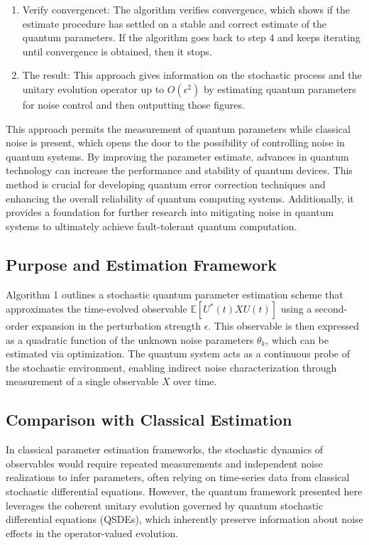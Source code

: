\documentclass[journal,twocolumn]{IEEEtran}
\begin{document}
\begin{enumerate}
 \item  Verify convergencet: The algorithm verifies convergence, which shows if the estimate procedure has settled on a stable and correct estimate of the quantum parameters. If the algorithm goes back to step 4 and keeps iterating until convergence is obtained, then it stops.
 \item The result: This approach gives information on the stochastic process and the unitary evolution operator up to $O(\epsilon^2)$ by estimating quantum parameters for noise control and then outputting those figures.
\end{enumerate}  
 This approach permits the measurement of quantum parameters while classical noise is present, which opens the door to the possibility of controlling noise in quantum systems. By improving the parameter estimate, advances in quantum technology can increase the performance and stability of quantum devices. This method is crucial for developing quantum error correction techniques and enhancing the overall reliability of quantum computing systems. Additionally, it provides a foundation for further research into mitigating noise in quantum systems to ultimately achieve fault-tolerant quantum computation. 
 \subsection{ Purpose and Estimation Framework}

Algorithm 1 outlines a stochastic quantum parameter estimation scheme that approximates the time-evolved observable \( \mathbb{E}[U^*(t) X U(t)] \) using a second-order expansion in the perturbation strength \( \epsilon \). This observable is then expressed as a quadratic function of the unknown noise parameters \( \theta_k \), which can be estimated via optimization. The quantum system acts as a continuous probe of the stochastic environment, enabling indirect noise characterization through measurement of a single observable \( X \) over time.
\subsection{ Comparison with Classical Estimation}

In classical parameter estimation frameworks, the stochastic dynamics of observables would require repeated measurements and independent noise realizations to infer parameters, often relying on time-series data from classical stochastic differential equations. However, the quantum framework presented here leverages the coherent unitary evolution governed by quantum stochastic differential equations (QSDEs), which inherently preserve information about noise effects in the operator-valued evolution.
\end{document}
